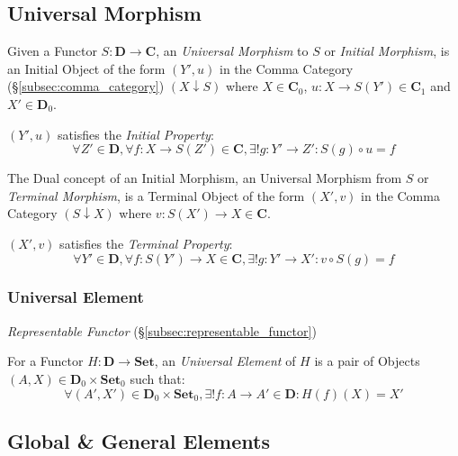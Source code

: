 \subsection{Universal Morphism}\label{subsec:universal_morphism}

Given a Functor $S: \mathbf{D} \rightarrow \mathbf{C}$, an
\emph{Universal Morphism} to $S$ or \emph{Initial Morphism}, is an
Initial Object of the form $(Y',u)$ in the Comma Category
(\S\ref{subsec:comma_category}) $(X \downarrow S)$ where $X \in
\mathbf{C}_0$, $u : X \rightarrow S(Y') \in \mathbf{C}_1$ and $X' \in
\mathbf{D}_0$.

$(Y', u)$ satisfies the \emph{Initial Property}:
\[
    \forall Z' \in \mathbf{D}, \forall f : X \rightarrow S(Z') \in
    \mathbf{C}, \exists! g : Y' \rightarrow Z' : S(g) \circ u = f
\]

The Dual concept of an Initial Morphism, an Universal Morphism from
$S$ or \emph{Terminal Morphism}, is a Terminal Object of the form
$(X',v)$ in the Comma Category $(S \downarrow X)$ where $v : S(X')
\rightarrow X \in \mathbf{C}$.

$(X',v)$ satisfies the \emph{Terminal Property}:
\[
    \forall Y' \in \mathbf{D}, \forall f : S(Y') \rightarrow X \in
    \mathbf{C}, \exists! g : Y' \rightarrow X' : v \circ S(g) = f
\]




\subsubsection{Universal Element}\label{subsec:universal_element}

\emph{Representable Functor} (\S\ref{subsec:representable_functor})

For a Functor $H : \mathbf{D} \rightarrow \mathbf{Set}$, an
\emph{Universal Element} of $H$ is a pair of Objects $(A,X) \in
\mathbf{D}_0 \times \mathbf{Set}_0$ such that:
\[
    \forall (A',X') \in \mathbf{D}_0 \times \mathbf{Set}_0,
    \exists! f : A \rightarrow A' \in \mathbf{D} : H(f)(X) = X'
\]



\subsection{Global \& General Elements}\label{subsec:general_element}

